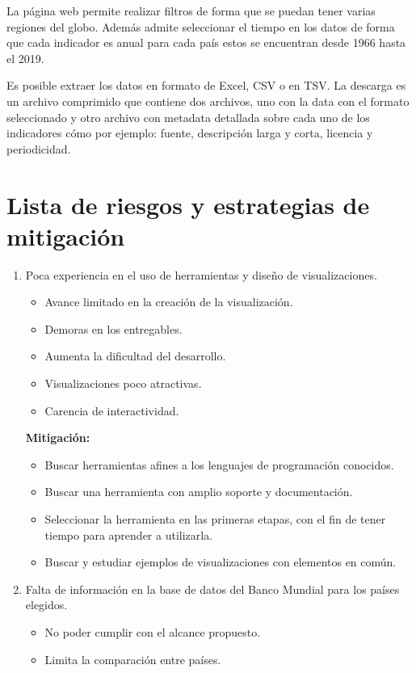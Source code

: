 \documentclass{article}
\begin{document}
La página web permite realizar filtros de forma que se puedan tener varias regiones del globo. Además admite seleccionar el tiempo en los datos de forma que cada indicador es anual para cada país estos se encuentran desde 1966 hasta el 2019. 

Es posible extraer los datos en formato de Excel, CSV o en TSV. La descarga es un archivo comprimido que contiene dos archivos, uno con la data con el formato seleccionado y otro  archivo con metadata detallada sobre cada uno de los indicadores cómo por ejemplo: fuente, descripción larga y corta, licencia y periodicidad. 


\section{Lista de riesgos y estrategias de mitigación}
\begin{enumerate}
    \item Poca experiencia en el uso de herramientas y diseño de visualizaciones.
    \begin{itemize}
        \item Avance limitado en la creación de la visualización.
        \item Demoras en los entregables.
        \item Aumenta la dificultad del desarrollo.
        \item Visualizaciones poco atractivas.
        \item Carencia de interactividad.
    \end{itemize}
    
\textbf{Mitigación:}
  \begin{itemize}
      \item Buscar herramientas afines a los lenguajes de programación conocidos.
      \item Buscar una herramienta con amplio soporte y documentación.
      \item Seleccionar la herramienta en las primeras etapas, con el fin de tener tiempo para aprender a utilizarla.
      \item Buscar y estudiar ejemplos de visualizaciones con elementos en común.
  \end{itemize}

    
    
\item Falta de información en la base de datos del Banco Mundial para los países elegidos.
    \begin{itemize}
        \item  No poder cumplir con el alcance propuesto.
        \item Limita la comparación entre países.
    \end{itemize}
   


\end{enumerate}
\end{document}

